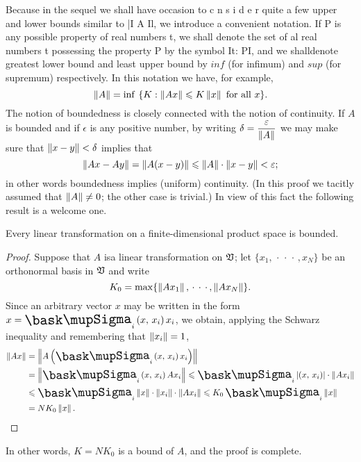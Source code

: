 Because in the sequel we shall have occasion to c n s i d e r quite a few upper
and lower bounds similar to |I A Il, we introduce a convenient notation. If P is
any possible property of real numbers t, we shall denote the set of al real
numbers t possessing the property P by the symbol It: PI, and we shalldenote
greatest lower bound and least upper bound by \(inf\) (for infimum) and \(sup\)
(for supremum) respectively. In this notation we have, for example,
\begin{equation*}
    \left\lVert A\right\rVert = \inf~\{K : \left\lVert Ax\right\rVert \leqslant K\left\lVert x\right\rVert \text{ for all } x\}.
\end{equation*}
The notion of boundedness is closely connected with the notion of continuity. If
\(A\) is bounded and if \(\epsilon\) is any positive number, by writing
\(\displaystyle\delta =\frac{\varepsilon}{\left\lVert A\right\rVert}\) we may make sure that
\(\left\lVert x - y\right\rVert < \delta\) implies that 
\begin{equation*}
    \left\lVert Ax - Ay\right\rVert = \left\lVert A(x - y)\right\rVert \leqslant \left\lVert A\right\rVert\cdot\left\lVert x - y\right\rVert < \varepsilon;
\end{equation*}
in other words boundedness implies (uniform) continuity. (In this proof we tacitly assumed that \(\left\lVert A\right\rVert \neq 0\); the other case is trivial.) In view of this fact the following result is a welcome one.

\begin{thmx}
    Every linear transformation on a finite-dimensional product space is bounded.
\end{thmx}

\begin{proof}
    Suppose that \(A\) isa linear transformation on \(\mathfrak{V}\); let \(\{x_1,
    \,\cdot\,\cdot\,\cdot\,, x_N\}\) be an orthonormal basis in \(\mathfrak{V}\) and
    write
    \begin{equation*}
        K_0 = \max\{\left\lVert Ax_1\right\rVert, \,\cdot\,\cdot\,\cdot\,, \left\lVert Ax_N\right\rVert\}.
    \end{equation*}
    Since an arbitrary vector \(x\) may be written in the form \(x = \sumx_i
    \innerprod{x}{x_i}x_i\), we obtain, applying the Schwarz inequality and
    remembering that \(\left\lVert x_i\right\rVert = 1\),
    \begin{align*}
        \norm{Ax} &= \norm{A\left(\sumx_i \innerprod{x}{x_i}x_i\right)}\\
        &= \norm{\sumx_i \innerprod{x}{x_i}Ax_i} \leq \sumx_i \abs{\innerprod{x}{x_i}}\cdot \norm{Ax_i}\\
        &\leq \sumx_i \norm{x} \cdot \norm{x_i} \cdot \norm{Ax_i} \leq K_0 \sumx_i \norm{x}\\
        &= NK_0 \norm{x}. 
    \end{align*}
\end{proof}
In other words, \(K = NK_0\) is a bound of \(A\), and the proof is complete.

